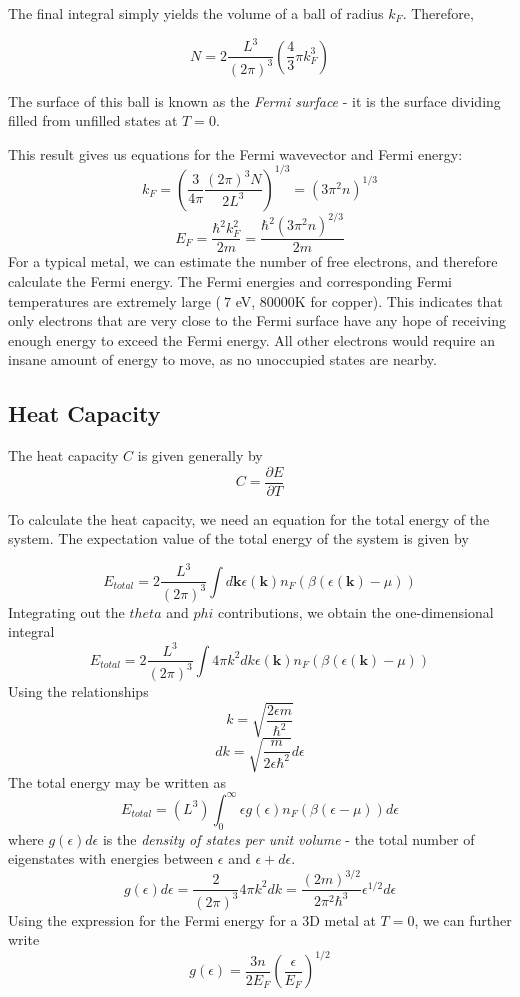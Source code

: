 \documentclass[10pt]{article}
\begin{document}
The final integral simply yields the volume of a ball of radius $k_{F}$. Therefore,

$$N = 2 \frac{L^{3}}{(2\pi)^{3}} \left (\frac{4}{3}\pi k_{F}^3\right )$$

The surface of this ball is known as the \emph{Fermi surface} - it is the surface dividing filled from unfilled states at $T = 0$.

This result gives us equations for the Fermi wavevector and Fermi energy:
$$
k_{F} = \left ( \frac{3}{4\pi}\frac{(2\pi)^{3} N}{2L^{3}}\right )^{1/3} = (3\pi^{2}n)^{1/3}
$$
$$
E_{F} = \frac{\hbar^{2}k_{F}^{2}}{2m} = \frac{\hbar^{2}(3\pi^{2}n)^{2/3}}{2m}
$$
For a typical metal, we can estimate the number of free electrons, and therefore calculate the Fermi energy. The Fermi energies and corresponding
Fermi temperatures are extremely large ($~7$ eV, $80000$K for copper). This indicates that only electrons that are very close to the Fermi surface
have any hope of receiving enough energy to exceed the Fermi energy. All other electrons would require an insane amount of energy to move, as no unoccupied states are nearby.


\subsection{Heat Capacity}
The heat capacity $C$ is given generally by
$$C = \frac{\partial E}{\partial T}$$

To calculate the heat capacity, we need an equation for the total energy of the system. The expectation value
of the total energy of the system is given by

$$
E_{total} = 2\frac{L^{3}}{(2\pi)^{3}}\int d\textbf{k} \epsilon(\textbf{k})n_{F}(\beta(\epsilon(\textbf{k}) - \mu))
$$
Integrating out the $theta$ and $phi$ contributions, we obtain the one-dimensional integral
$$
E_{total} = 2\frac{L^{3}}{(2\pi)^{3}}\int 4\pi k^{2} dk \epsilon(\textbf{k})n_{F}(\beta(\epsilon(\textbf{k}) - \mu))
$$
Using the relationships
$$
k = \sqrt{\frac{2\epsilon m}{\hbar^{2}}}
$$
$$
dk = \sqrt{\frac{m}{2\epsilon \hbar^{2}}}d\epsilon
$$
The total energy may be written as
$$
E_{total} = (L^{3}) \int_{0}^{\infty} \epsilon  g(\epsilon)  n_{F}(\beta(\epsilon-\mu))d\epsilon
$$
where $g(\epsilon)d\epsilon$ is the \emph{density of states per unit volume} - the total number of eigenstates with energies between $\epsilon$
and $\epsilon + d\epsilon$.
$$g(\epsilon)d\epsilon = \frac{2}{(2\pi)^{3}}4\pi k^{2}dk = \frac{(2m)^{3/2}}{2\pi^{2}\hbar^{3}}\epsilon^{1/2}d\epsilon$$
Using the expression for the Fermi energy for a 3D metal at $T=0$, we can further write
$$
g(\epsilon) = \frac{3n}{2E_{F}} \left (\frac{\epsilon}{E_{F}} \right)^{1/2}
$$
\end{document}
